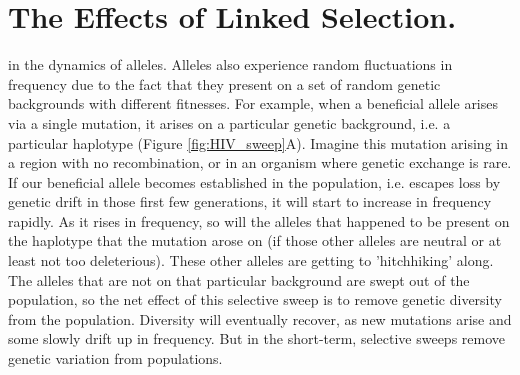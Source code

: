 \chapter{The Effects of Linked Selection.}

 in the dynamics of
alleles. Alleles also experience random fluctuations in frequency due to
the fact that they present on a set of random genetic backgrounds with
different fitnesses. For example, when a beneficial allele arises via a single mutation, it arises on
a particular genetic background, i.e. a particular haplotype (Figure \ref{fig:HIV_sweep}A). Imagine this mutation arising in a region with no recombination, or in an
organism where genetic exchange is rare. If our beneficial allele
becomes established in the population, i.e. escapes loss by genetic
drift in those first few generations, it will start to increase in
frequency rapidly. As it rises in frequency, so will the alleles that happened to
be present on the haplotype that the mutation arose on (if those
other alleles are neutral or at least not too deleterious). These
other alleles are getting to 'hitchhiking' along. The alleles that are
not on that particular background are swept out of the population, so the net effect
of this selective sweep is to remove genetic diversity from the
population. Diversity will eventually recover, as new mutations
arise and some slowly drift up in frequency. But in the
short-term, selective sweeps remove genetic variation from
populations. 

